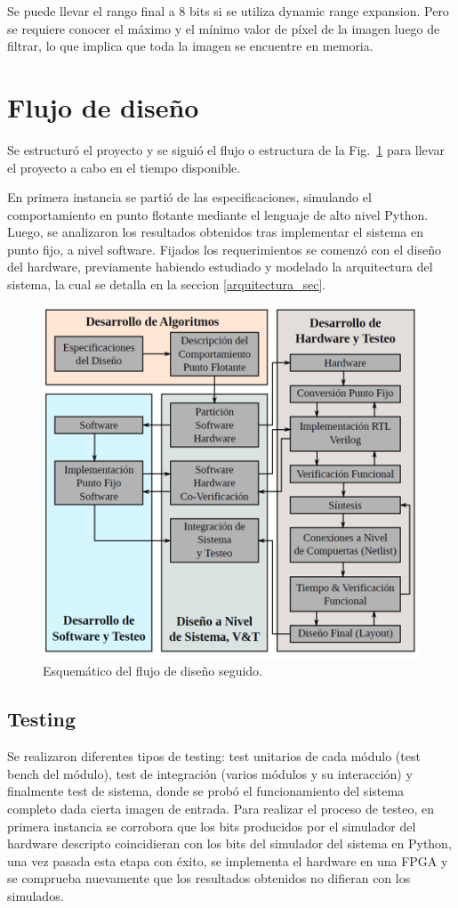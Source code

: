 Se puede llevar el rango final a 8 bits si se utiliza dynamic range expansion.
Pero se requiere conocer el m\'aximo y el m\'inimo valor de p\'ixel de la imagen
luego de filtrar, lo que implica que toda la imagen se encuentre en memoria.

\section{Flujo de diseño} \label{flujo_subsecc}

Se estructuró el proyecto y se siguió el flujo o estructura de la
Fig.~\ref{design_flow} para llevar el proyecto a cabo en el tiempo disponible.

En primera instancia se partió de las especificaciones, simulando el comportamiento en punto flotante mediante el lenguaje de alto nivel Python. Luego, se analizaron los resultados obtenidos tras implementar el sistema en punto fijo, a nivel software. 
Fijados los requerimientos se comenzó con el diseño del hardware,
previamente habiendo estudiado y modelado la arquitectura del sistema, la cual
se detalla en la seccion \ref{arquitectura_sec}.

\begin{figure}
\centering
\includegraphics{flujo_de_dis.png}
\caption{Esquemático del flujo de diseño seguido.}
\label{design_flow}
\end{figure}

\subsection{Testing}

Se realizaron diferentes tipos de testing: test
unitarios de cada módulo (test bench del módulo), test de integración (varios
módulos y su interacción) y finalmente test de sistema, donde se probó el
funcionamiento del sistema completo dada cierta imagen de entrada. Para realizar
el proceso de testeo, en primera instancia se corrobora que los bits producidos
por el simulador del hardware descripto coincidieran con los bits del simulador
del sistema en Python, una vez pasada esta etapa con éxito, se implementa el
hardware en una FPGA y se comprueba nuevamente que los resultados obtenidos no
difieran con los simulados.